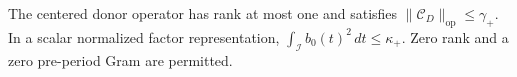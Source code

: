 The centered donor operator has rank at most one and satisfies \(\|\mathcal C_D\|_{\mathrm{op}}\le\gamma_+\).  In a scalar normalized factor representation, \(\int_{\mathcal I}b_0(t)^2\,dt\le\kappa_+\).  Zero rank and a zero pre-period Gram are permitted.
